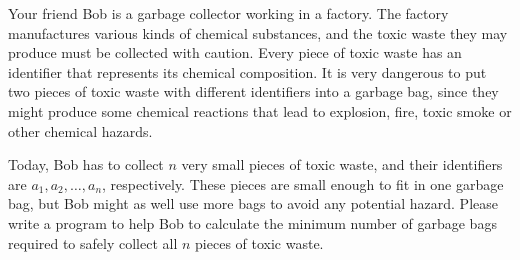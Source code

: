 Your friend Bob is a garbage collector working in a factory.
The factory manufactures various kinds of chemical substances,
and the toxic waste they may produce must be collected with caution.
Every piece of toxic waste has an identifier that represents
its chemical composition.
It is very dangerous to put two pieces of toxic waste with different identifiers 
into a garbage bag, since they might produce some chemical reactions 
that lead to explosion, fire, toxic smoke or other chemical hazards.

Today, Bob has to collect $n$ very small pieces of toxic waste, 
and their identifiers are $a_1,a_2,\ldots,a_n$, respectively. 
These pieces are small enough to fit in one garbage bag,
but Bob might as well use more bags to avoid any potential hazard.
Please write a program to help Bob to calculate the minimum number of 
garbage bags required to safely collect all $n$ pieces of toxic waste.
